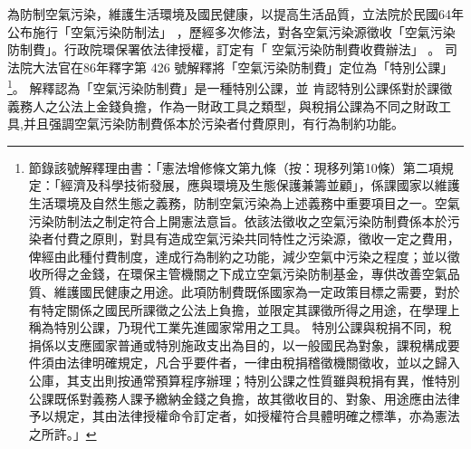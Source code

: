 \documentclass[12pt,a4paper]{article}
\begin{document}
為防制空氣污染，維護生活環境及國民健康，以提高生活品質，立法院於民國64年公布施行「空氣污染防制法」
，歷經多次修法，對各空氣污染源徵收「空氣污染防制費」。行政院環保署依法律授權，訂定有「	空氣污染防制費收費辦法」
。
司法院大法官在86年釋字第 426 號解釋將「空氣污染防制費」定位為「特別公課」
\footnote{節錄該號解釋理由書：「憲法增修條文第九條（按：現移列第10條）第二項規定：「經濟及科學技術發展，應與環境及生態保護兼籌並顧」，係課國家以維護生活環境及自然生態之義務，防制空氣污染為上述義務中重要項目之一。空氣污染防制法之制定符合上開憲法意旨。依該法徵收之空氣污染防制費係本於污染者付費之原則，對具有造成空氣污染共同特性之污染源，徵收一定之費用，俾經由此種付費制度，達成行為制約之功能，減少空氣中污染之程度；並以徵收所得之金錢，在環保主管機關之下成立空氣污染防制基金，專供改善空氣品質、維護國民健康之用途。此項防制費既係國家為一定政策目標之需要，對於有特定關係之國民所課徵之公法上負擔，並限定其課徵所得之用途，在學理上稱為特別公課，乃現代工業先進國家常用之工具。
特別公課與稅捐不同，稅捐係以支應國家普通或特別施政支出為目的，以一般國民為對象，課稅構成要件須由法律明確規定，凡合乎要件者，一律由稅捐稽徵機關徵收，並以之歸入公庫，其支出則按通常預算程序辦理；特別公課之性質雖與稅捐有異，惟特別公課既係對義務人課予繳納金錢之負擔，故其徵收目的、對象、用途應由法律予以規定，其由法律授權命令訂定者，如授權符合具體明確之標準，亦為憲法之所許。」}。
解釋認為「空氣污染防制費」是一種特別公課，並
肯認特別公課係對於課徵義務人之公法上金錢負擔，作為一財政工具之類型，與稅捐公課為不同之財政工具,并且强調空氣污染防制費係本於污染者付費原則，有行為制約功能。
\end{document}
